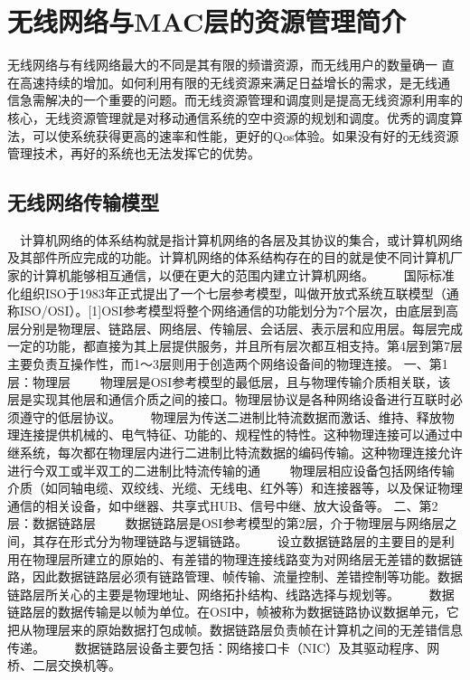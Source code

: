\chapter{无线网络与MAC层的资源管理简介}
\label{chap_brief}
无线网络与有线网络最大的不同是其有限的频谱资源，而无线用户的数量确一
直在高速持续的增加。如何利用有限的无线资源来满足日益增长的需求，是无线通
信急需解决的一个重要的问题。而无线资源管理和调度则是提高无线资源利用率的
核心，无线资源管理就是对移动通信系统的空中资源的规划和调度。优秀的调度算
法，可以使系统获得更高的速率和性能，更好的Qos体验。如果没有好的无线资源
管理技术，再好的系统也无法发挥它的优势。

\section{无线网络传输模型}
　计算机网络的体系结构就是指计算机网络的各层及其协议的集合，或计算机网络及其部件所应完成的功能。计算机网络的体系结构存在的目的就是使不同计算机厂家的计算机能够相互通信，以便在更大的范围内建立计算机网络。
　　国际标准化组织ISO于1983年正式提出了一个七层参考模型，叫做开放式系统互联模型（通称ISO/OSI）。[1]OSI参考模型将整个网络通信的功能划分为7个层次，由底层到高层分别是物理层、链路层、网络层、传输层、会话层、表示层和应用层。每层完成一定的功能，都直接为其上层提供服务，并且所有层次都互相支持。第4层到第7层主要负责互操作性，而1～3层则用于创造两个网络设备间的物理连接。
        一、第1层：物理层
　　物理层是OSI参考模型的最低层，且与物理传输介质相关联，该层是实现其他层和通信介质之间的接口。物理层协议是各种网络设备进行互联时必须遵守的低层协议。 
　　物理层为传送二进制比特流数据而激话、维持、释放物理连接提供机械的、电气特征、功能的、规程性的特性。这种物理连接可以通过中继系统，每次都在物理层内进行二进制比特流数据的编码传输。这种物理连接允许进行今双工或半双工的二进制比特流传输的通   
　　物理层相应设备包括网络传输介质（如同轴电缆、双绞线、光缆、无线电、红外等）和连接器等，以及保证物理通信的相关设备，如中继器、共享式HUB、信号中继、放大设备等。
        二、第2层：数据链路层
　　数据链路层是OSI参考模型的第2层，介于物理层与网络层之间，其存在形式分为物理链路与逻辑链路。
　　设立数据链路层的主要目的是利用在物理层所建立的原始的、有差错的物理连接线路变为对网络层无差错的数据链路，因此数据链路层必须有链路管理、帧传输、流量控制、差错控制等功能。数据链路层所关心的主要是物理地址、网络拓扑结构、线路选择与规划等。
　　数据链路层的数据传输是以帧为单位。在OSI中，帧被称为数据链路协议数据单元，它把从物理层来的原始数据打包成帧。数据链路层负责帧在计算机之间的无差错信息传递。
　　数据链路层设备主要包括：网络接口卡（NIC）及其驱动程序、网桥、二层交换机等。
